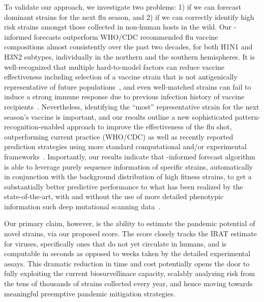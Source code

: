 \documentclass[onecolumn, compsoc,10pt]{IEEEtran}
\begin{document}
To validate our approach, we investigate two problems: 1)  if we can forecast dominant strains for the next flu season, and 2) if we can correctly identify high risk strains amongst those collected in non-human hosts in the wild.
Our \enet-informed forecasts outperform  WHO/CDC recommended flu vaccine compositions almost consistently over the past two decades, for both H1N1 and H3N2 subtypes, individually in the northern and the southern hemispheres.
It is well-recognized that multiple hard-to-model factors can reduce vaccine effectiveness including selection of a vaccine strain that is not antigenically representative of future populations~\cite{gouma2020antigenic}, and even well-matched strains can 
fail to induce a strong immune response due to previous infection history of vaccine recipients~\cite{cobey2018poor}. Nevertheless, identifying the ``most'' representative strain for the next season's vaccine is important, and our results outline a new sophisticated pattern-recognition-enabled approach to improve the effectiveness of the flu shot, outperforming current practice (WHO/CDC) as well as  recently reported prediction strategies  using more standard computational and/or experimental frameworks~\cite{huddleston2020integrating,neher2014predicting}.
Importantly, our results indicate that \enet-informed forecast algorithm is able to leverage purely sequence information of specific strains, automatically in conjunction with the background distribution of high fitness strains, to  get a substantially  better predictive performance to what has been realized by the state-of-the-art, with and without the use of more detailed phenotypic information such deep mutational scanning data~\cite{huddleston2020integrating,neher2014predicting}.


Our primary claim, however,  is the ability to estimate the pandemic potential of novel strains, via our proposed  \erisk score.  The \erisk score closely tracks  the IRAT estimate for  \infl  viruses, specifically ones that do not yet circulate in humans, and is computable in seconds as opposed to weeks taken by the detailed experimental assays. This dramatic reduction in time and cost potentially opens the door to fully exploiting the  current biosurvellinace capacity, scalably analyzing risk from  the tens of thousands of strains collected every year, and hence moving towards   meaningful preemptive pandemic mitigation strategies.
\end{document}
